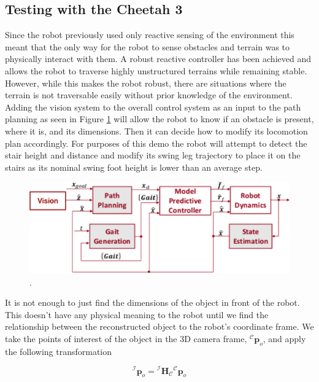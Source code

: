 \subsection{Testing with the Cheetah 3}

Since the robot previously used only reactive sensing of the environment this meant that the only way for the robot to sense obstacles and terrain was to physically interact with them. A robust reactive controller has been achieved and allows the robot to traverse highly unstructured terrains while remaining stable. However, while this makes the robot robust, there are situations where the terrain is not traversable easily without prior knowledge of the environment. Adding the vision system to the overall control system as an input to the path planning as seen in Figure \ref{fig:BD} will allow the robot to know if an obstacle is present, where it is, and its dimensions. Then it can decide how to modify its locomotion plan accordingly. For purposes of this demo the robot will attempt to detect the stair height and distance and modify its swing leg trajectory to place it on the stairs as its nominal swing foot height is lower than an average step.
\begin{figure}[!h]
\centering
\includegraphics[width=\columnwidth]{Figures/BlockDiagram.pdf}
\caption{.}
\label{fig:BD}
\end{figure}

It is not enough to just find the dimensions of the object in front of the robot. This doesn't have any physical meaning to the robot until we find the relationship between the reconstructed object to the robot's coordinate frame. We take the points of interest of the object in the 3D camera frame, ${}^\mathcal{C}\bm{p}_o$, and apply the following transformation

\begin{equation}
{}^\mathcal{I}\bm{p}_o = {}^\mathcal{I}\bm{H}_\mathcal{C}{}^\mathcal{C}\bm{p}_o
\end{equation}

